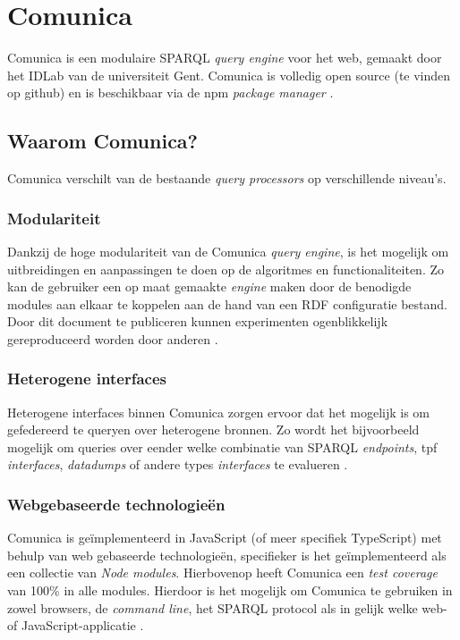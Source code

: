 \section{Comunica}
\label{sec:comunica}

Comunica is een modulaire SPARQL \textit{query engine} voor het web, gemaakt door het IDLab van de universiteit Gent. Comunica is volledig open source (te vinden op github) en is beschikbaar via de npm \textit{package manager} \cite{taelman2018comunica}.

\subsection{Waarom Comunica?}
Comunica verschilt van de bestaande \textit{query processors} op verschillende niveau's. 

\subsubsection{Modulariteit}
Dankzij de hoge modulariteit van de Comunica \textit{query engine}, is het mogelijk om uitbreidingen en aanpassingen te doen op de algoritmes en functionaliteiten. Zo kan de gebruiker een op maat gemaakte \textit{engine} maken door de benodigde modules aan elkaar te koppelen aan de hand van een RDF configuratie bestand. Door dit document te publiceren kunnen experimenten ogenblikkelijk gereproduceerd worden door anderen \cite{taelman2018comunica}.

\subsubsection{Heterogene interfaces}
Heterogene interfaces binnen Comunica zorgen ervoor dat het mogelijk is om gefedereerd te queryen over heterogene bronnen. Zo wordt het bijvoorbeeld mogelijk om queries over eender welke combinatie van SPARQL \textit{endpoints}, \acrshort{tpf} \textit{interfaces}, \textit{datadumps} of andere types \textit{interfaces} te evalueren \cite{taelman2018comunica}.

\subsubsection{Webgebaseerde technologieën}
Comunica is geïmplementeerd in JavaScript (of meer specifiek TypeScript) met behulp van web gebaseerde technologieën, specifieker is het geïmplementeerd als een collectie van \textit{Node modules}. Hierbovenop heeft Comunica een \textit{test coverage} van 100\% in alle modules. Hierdoor is het mogelijk om Comunica te gebruiken in zowel browsers, de \textit{command line}, het SPARQL protocol als in gelijk welke web- of JavaScript-applicatie \cite{taelman2018comunica}.


